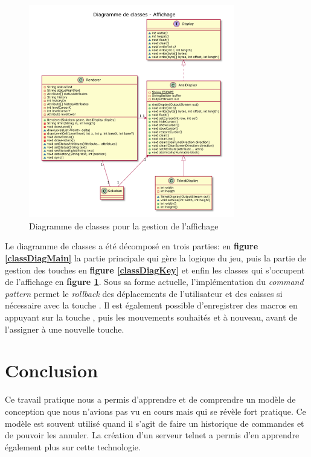 \documentclass[french]{article}
\begin{document}
	\begin{figure}[H]
		\centering
		\includegraphics[width=0.8\textwidth]{affichage}
		\caption{Diagramme de classes pour la gestion de l'affichage}
		\label{classDiagDisplay}
	\end{figure}
	
	Le diagramme de classes a été décomposé en trois parties: en \textbf{figure \ref{classDiagMain}} la partie principale qui gère la logique du jeu, puis la partie de gestion des touches en \textbf{figure \ref{classDiagKey}} et enfin les classes qui s'occupent de l'affichage en \textbf{figure \ref{classDiagDisplay}}. Sous sa forme actuelle, l'implémentation du \textit{command pattern} permet le \textit{rollback} des déplacements de l'utilisateur et des caisses si nécessaire avec la touche . Il est également possible d'enregistrer des macros en appuyant sur la touche , puis les mouvements souhaités et  à nouveau, avant de l'assigner à une nouvelle touche.
	
	\section{Conclusion}
	Ce travail pratique nous a permis d'apprendre et de comprendre un modèle de conception que nous n'avions pas vu en cours mais qui se révèle fort pratique. Ce modèle est souvent utilisé quand il s'agit de faire un historique de commandes et de pouvoir les annuler. La création d'un serveur telnet a permis d'en apprendre également plus sur cette technologie.
\end{document}
